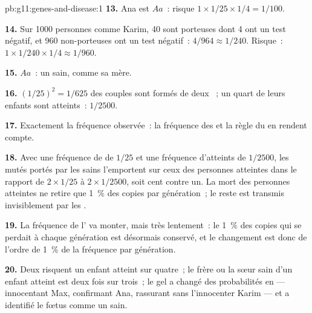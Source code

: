 \begin{solution}{pb:g11:genes-and-disease:1}
\textbf{13.} Ana est $Aa$~: risque $1 \times 1/25 \times 1/4 = 1/100$.

\textbf{14.} Sur 1000 personnes comme Karim, 40 sont porteuses dont 4
ont un test négatif, et 960 non-porteuses ont un test négatif~: $4/964 \approx
1/240$. Risque~: $1 \times 1/240 \times 1/4 \approx 1/960$.

\textbf{15.} $Aa$~: un  sain, comme sa mère.

\textbf{16.} $(1/25)^2 = 1/625$ des couples sont formés de deux
~; un quart de leurs enfants sont atteints~: $1/2500$.

\textbf{17.} Exactement la fréquence observée~: la fréquence des
 et la règle du  en rendent compte.

\textbf{18.} Avec une fréquence de  de $1/25$ et une fréquence
d'atteints de $1/2500$, les  mutés portés par les  sains
l'emportent sur ceux des personnes atteintes dans le rapport de
$2 \times 1/25$ à $2 \times
1/2500$, soit cent contre un. La mort des personnes atteintes ne retire
que 1~\% des copies par génération~; le reste est transmis
invisiblement par les .

\textbf{19.} La fréquence de l' va monter, mais très lentement~:
le 1~\% des copies qui se perdait à chaque génération est désormais
conservé, et le changement est donc de l'ordre de 1~\% de la fréquence
par génération.

\textbf{20.} Deux  risquent un enfant atteint sur quatre~; le
frère ou la sœur sain d'un enfant atteint est  deux fois sur
trois~; le gel a changé des probabilités en  --- innocentant
Max, confirmant Ana, rassurant sans l'innocenter Karim --- et a
identifié le fœtus comme un  sain.
\end{solution}
